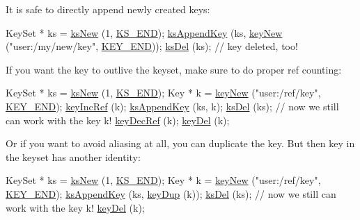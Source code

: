 It is safe to directly append newly created keys\+: 
\begin{DoxyCodeInclude}
KeySet * ks = \hyperlink{group__keyset_ga671e1aaee3ae9dc13b4834a4ddbd2c3c}{ksNew} (1, \hyperlink{group__keyset_ga7a28fce3773b2c873c94ac80b8b4cd54}{KS\_END});
\hyperlink{group__keyset_gaa5a1d467a4d71041edce68ea7748ce45}{ksAppendKey} (ks, \hyperlink{group__key_gad23c65b44bf48d773759e1f9a4d43b89}{keyNew} (\textcolor{stringliteral}{"user:/my/new/key"}, \hyperlink{group__key_gga9b703ca49f48b482def322b77d3e6bc8aa8adb6fcb92dec58fb19410eacfdd403}{KEY\_END}));
\hyperlink{group__keyset_ga27e5c16473b02a422238c8d970db7ac8}{ksDel} (ks);
\textcolor{comment}{// key deleted, too!}
\end{DoxyCodeInclude}
 If you want the key to outlive the keyset, make sure to do proper ref counting\+: 
\begin{DoxyCodeInclude}
KeySet * ks = \hyperlink{group__keyset_ga671e1aaee3ae9dc13b4834a4ddbd2c3c}{ksNew} (1, \hyperlink{group__keyset_ga7a28fce3773b2c873c94ac80b8b4cd54}{KS\_END});
Key * k = \hyperlink{group__key_gad23c65b44bf48d773759e1f9a4d43b89}{keyNew} (\textcolor{stringliteral}{"user:/ref/key"}, \hyperlink{group__key_gga9b703ca49f48b482def322b77d3e6bc8aa8adb6fcb92dec58fb19410eacfdd403}{KEY\_END});
\hyperlink{group__key_ga6970a6f254d67af7e39f8e469bb162f1}{keyIncRef} (k);
\hyperlink{group__keyset_gaa5a1d467a4d71041edce68ea7748ce45}{ksAppendKey} (ks, k);
\hyperlink{group__keyset_ga27e5c16473b02a422238c8d970db7ac8}{ksDel} (ks);
\textcolor{comment}{// now we still can work with the key k!}
\hyperlink{group__key_ga2c6433ca22109e4e141946057eccb283}{keyDecRef} (k);
\hyperlink{group__key_ga3df95bbc2494e3e6703ece5639be5bb1}{keyDel} (k);
\end{DoxyCodeInclude}
 Or if you want to avoid aliasing at all, you can duplicate the key. But then key in the keyset has another identity\+: 
\begin{DoxyCodeInclude}
KeySet * ks = \hyperlink{group__keyset_ga671e1aaee3ae9dc13b4834a4ddbd2c3c}{ksNew} (1, \hyperlink{group__keyset_ga7a28fce3773b2c873c94ac80b8b4cd54}{KS\_END});
Key * k = \hyperlink{group__key_gad23c65b44bf48d773759e1f9a4d43b89}{keyNew} (\textcolor{stringliteral}{"user:/ref/key"}, \hyperlink{group__key_gga9b703ca49f48b482def322b77d3e6bc8aa8adb6fcb92dec58fb19410eacfdd403}{KEY\_END});
\hyperlink{group__keyset_gaa5a1d467a4d71041edce68ea7748ce45}{ksAppendKey} (ks, \hyperlink{group__key_gae6ec6a60cc4b8c1463fa08623d056ce3}{keyDup} (k));
\hyperlink{group__keyset_ga27e5c16473b02a422238c8d970db7ac8}{ksDel} (ks);
\textcolor{comment}{// now we still can work with the key k!}
\hyperlink{group__key_ga3df95bbc2494e3e6703ece5639be5bb1}{keyDel} (k);
\end{DoxyCodeInclude}


